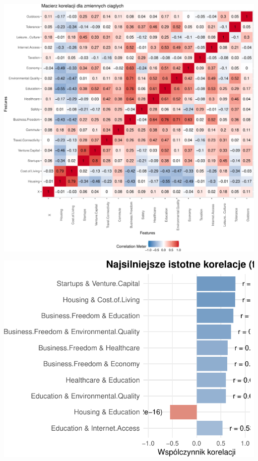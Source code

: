 \documentclass[
  12pt,
]{article}
\begin{document}
\begin{center}\includegraphics{Sprawozdanie2_files/figure-latex/wykresy_korelacji-1} \end{center}

\begin{center}\includegraphics{Sprawozdanie2_files/figure-latex/znaczace_korelacje-1} \end{center}
\end{document}
